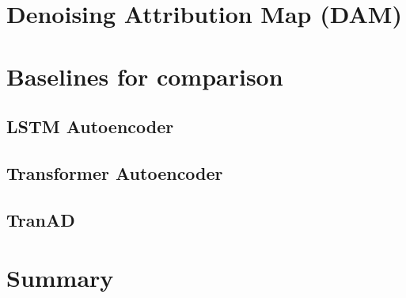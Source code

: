 \section{Denoising Attribution Map (DAM)}

\section{Baselines for comparison}
\subsection{LSTM Autoencoder}
\subsection{Transformer Autoencoder}
\subsection{TranAD}

\section{Summary}
